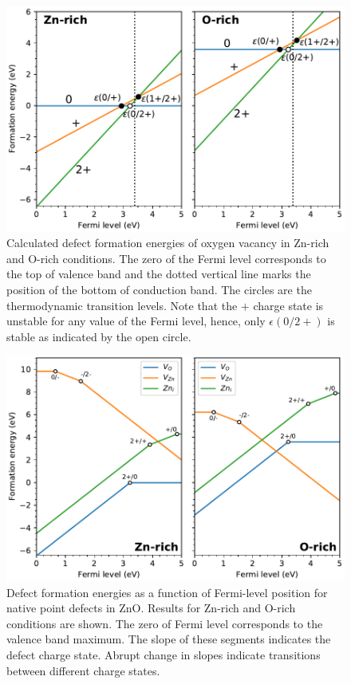 \begin{figure}[tbh!]
	\centering
	\includegraphics[width=0.65\linewidth]{"images/rnd/O_vac-formation"}
	\caption[Calculated defect formation energies of oxygen vacancy in Zn-rich and O-rich conditions]{Calculated defect formation energies of oxygen vacancy in Zn-rich and O-rich conditions. The zero of the Fermi level corresponds to the top of valence band and the dotted vertical line marks the position of the bottom of conduction band. The circles are the thermodynamic transition levels. Note that the $+$ charge state is unstable for any value of the Fermi level, hence, only $\epsilon(0/2+)$ is stable as indicated by the open circle. }
	\label{fig:O_vac-form}
\end{figure}

\begin{figure}[tbh!]
	\centering
	\includegraphics[width=0.65\linewidth]{"images/rnd/defect-formation"}
	\caption[Defect formation energies as a function of Fermi-level position for native point defects in ZnO]{Defect formation energies as a function of Fermi-level position for native point defects in ZnO. Results for Zn-rich and O-rich conditions are shown. The zero of Fermi level corresponds to the valence band maximum. The slope of these segments indicates the defect charge state. Abrupt change in slopes indicate transitions between different charge states.}
	\label{fig:defect-formE}
\end{figure}

